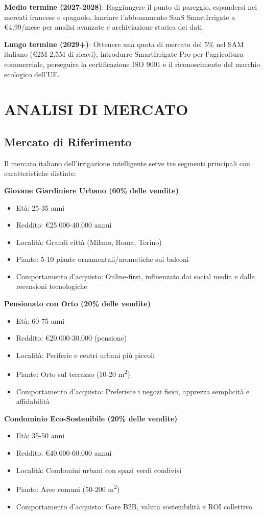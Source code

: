\documentclass[11pt,a4paper]{report}
\begin{document}
\textbf{Medio termine (2027-2028)}: Raggiungere il punto di pareggio, espandersi nei mercati francese e spagnolo, lanciare l'abbonamento SaaS SmartIrrigate a €4,99/mese per analisi avanzate e archiviazione storica dei dati.

\textbf{Lungo termine (2029+)}: Ottenere una quota di mercato del 5\% nel SAM italiano (€2M-2,5M di ricavi), introdurre SmartIrrigate Pro per l'agricoltura commerciale, perseguire la certificazione ISO 9001 e il riconoscimento del marchio ecologico dell'UE.

\chapter{ANALISI DI MERCATO}

\section{Mercato di Riferimento}
Il mercato italiano dell'irrigazione intelligente serve tre segmenti principali con caratteristiche distinte:

\textbf{Giovane Giardiniere Urbano (60\% delle vendite)}
\begin{itemize}
    \item Età: 25-35 anni
    \item Reddito: €25.000-40.000 annui
    \item Località: Grandi città (Milano, Roma, Torino)
    \item Piante: 5-10 piante ornamentali/aromatiche sui balconi
    \item Comportamento d'acquisto: Online-first, influenzato dai social media e dalle recensioni tecnologiche
\end{itemize}

\textbf{Pensionato con Orto (20\% delle vendite)}
\begin{itemize}
    \item Età: 60-75 anni
    \item Reddito: €20.000-30.000 (pensione)
    \item Località: Periferie e centri urbani più piccoli
    \item Piante: Orto sul terrazzo (10-20 m\textsuperscript{2})
    \item Comportamento d'acquisto: Preferisce i negozi fisici, apprezza semplicità e affidabilità
\end{itemize}

\textbf{Condominio Eco-Sostenibile (20\% delle vendite)}
\begin{itemize}
    \item Età: 35-50 anni
    \item Reddito: €40.000-60.000 annui
    \item Località: Condomini urbani con spazi verdi condivisi
    \item Piante: Aree comuni (50-200 m\textsuperscript{2})
    \item Comportamento d'acquisto: Gare B2B, valuta sostenibilità e ROI collettivo
\end{itemize}
\end{document}
